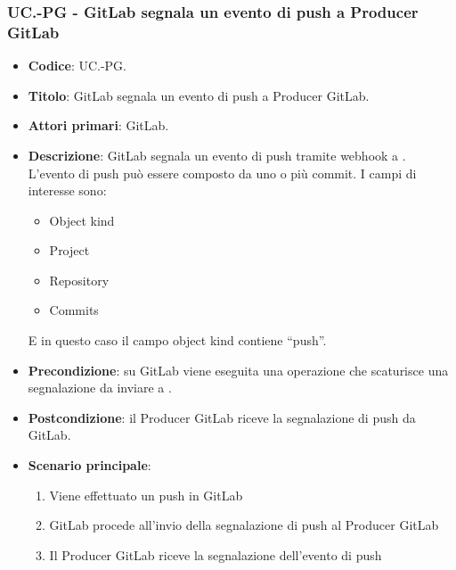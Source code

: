 \subsubsection{UC\theuccount.\thesubuccount-PG - GitLab segnala un evento di push a Producer GitLab}
\begin{itemize}
\item \textbf{Codice}: UC\theuccount.\thesubuccount-PG.
\item \textbf{Titolo}: GitLab segnala un evento di push a Producer GitLab.
\item \textbf{Attori primari}: GitLab.
\item \textbf{Descrizione}: GitLab segnala un evento di push tramite webhook a \progetto. L'evento di push può essere composto da uno o più commit.
I campi di interesse sono:
\begin{itemize}
    \item Object kind
    \item Project
    \item Repository
    \item Commits
\end{itemize}
E in questo caso il campo object kind contiene ``push''.
\item \textbf{Precondizione}: su GitLab viene eseguita una operazione che scaturisce una
segnalazione da inviare a \progetto.
\item \textbf{Postcondizione}: il Producer GitLab riceve la segnalazione di push da GitLab.
\item \textbf{Scenario principale}:
\begin{enumerate}
    \item Viene effettuato un push in GitLab
    \item GitLab procede all'invio della segnalazione di push al Producer GitLab
    \item Il Producer GitLab riceve la segnalazione dell'evento di push
\end{enumerate}

\end{itemize}



